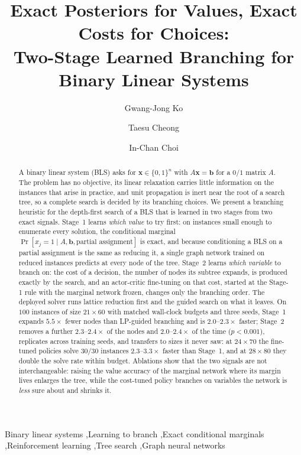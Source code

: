 \documentclass[final,5p,times,twocolumn,authoryear]{elsarticle}
\begin{document}
\begin{frontmatter}

\title{Exact Posteriors for Values, Exact Costs for Choices:\\
Two-Stage Learned Branching for Binary Linear Systems}

\author[ku]{Gwang-Jong Ko}
\author[ku]{Taesu Cheong}
\author[ku]{In-Chan Choi}

\begin{abstract}
A binary linear system (BLS) asks for $\mathbf{x}\in\{0,1\}^n$ with $A\mathbf{x}=\mathbf{b}$ for a $0/1$ matrix $A$. The problem has no objective, its linear relaxation carries little information on the instances that arise in practice, and unit propagation is inert near the root of a search tree, so a complete search is decided by its branching choices. We present a branching heuristic for the depth-first search of a BLS that is learned in two stages from two exact signals. Stage~1 learns \emph{which value} to try first: on instances small enough to enumerate every solution, the conditional marginal $\Pr[x_j{=}1\mid A,\mathbf{b},\text{partial assignment}]$ is exact, and because conditioning a BLS on a partial assignment is the same as reducing it, a single graph network trained on reduced instances predicts at every node of the tree. Stage~2 learns \emph{which variable} to branch on: the cost of a decision, the number of nodes its subtree expands, is produced exactly by the search, and an actor-critic fine-tuning on that cost, started at the Stage-1 rule with the marginal network frozen, changes only the branching order. The deployed solver runs lattice reduction first and the guided search on what it leaves. On $100$ instances of size $21\times60$ with matched wall-clock budgets and three seeds, Stage~1 expands $5.5\times$ fewer nodes than LP-guided branching and is $2.0$--$2.3\times$ faster; Stage~2 removes a further $2.3$--$2.4\times$ of the nodes and $2.0$--$2.4\times$ of the time ($p<0.001$), replicates across training seeds, and transfers to sizes it never saw: at $24\times70$ the fine-tuned policies solve $30/30$ instances $2.3$--$3.3\times$ faster than Stage~1, and at $28\times80$ they double the solve rate within budget. Ablations show that the two signals are not interchangeable: raising the value accuracy of the marginal network where its margin lives enlarges the tree, while the cost-tuned policy branches on variables the network is \emph{less} sure about and shrinks it.
\end{abstract}

\begin{keyword}
Binary linear systems \sep Learning to branch \sep Exact conditional marginals \sep Reinforcement learning \sep Tree search \sep Graph neural networks
\end{keyword}

\end{frontmatter}
\end{document}
